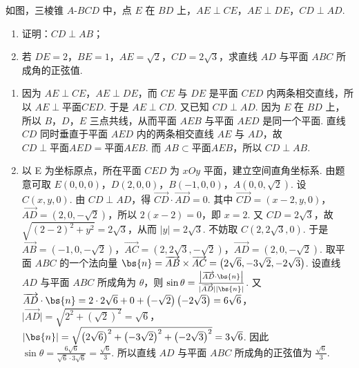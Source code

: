 \begin{problem}
如图，三棱锥 \(A\)-\(BCD\) 中，点 \(E\) 在 \(BD\) 上，\(AE\perp CE\)，\(AE\perp DE\)，\(CD\perp AD\).

\begin{enumerate}
\item 证明：\(CD\perp AB\)；
\item 若 \(DE=2\)，\(BE=1\)，\(AE=\sqrt{2}\)，\(CD=2\sqrt{3}\)，求直线 \(AD\) 与平面 \(ABC\) 所成角的正弦值.
\end{enumerate}

\end{problem}

\begin{solution}
\begin{enumerate}
\item 因为 \(AE\perp CE\)，\(AE\perp DE\)，而 \(CE\) 与 \(DE\) 是平面 \(CED\) 内两条相交直线，所以 \(AE\perp \text{平面} CED\). 于是 \(AE\perp CD\).
又已知 \(CD\perp AD\). 因为 \(E\) 在 \(BD\) 上，所以 \(B\)，\(D\)，\(E\) 三点共线，从而平面 \(AEB\) 与平面 \(AED\) 是同一个平面. 直线 \(CD\) 同时垂直于平面 \(AED\) 内的两条相交直线 \(AE\) 与 \(AD\)，故 \(CD\perp \text{平面} AED=\text{平面} AEB\). 而 \(AB\subset \text{平面} AEB\)，所以 \(CD\perp AB\).

\item 以 E 为坐标原点，所在平面 \(CED\) 为 \(xOy\) 平面，建立空间直角坐标系. 由题意可取 \(E(0,0,0)\)，\(D(2,0,0)\)，\(B(-1,0,0)\)，\(A(0,0,\sqrt{2})\). 设 \(C(x,y,0)\).
由 \(CD\perp AD\)，得 \(\overrightarrow{CD}\cdot \overrightarrow{AD}=0\). 其中 \(\overrightarrow{CD}=(x-2,y,0)\)，\(\overrightarrow{AD}=(2,0,-\sqrt{2})\)，所以 \(2\left( x-2 \right)=0\)，即 \(x=2\). 又 \(CD=2\sqrt{3}\)，故 \(\sqrt{\left( 2-2 \right)^2+y^2}=2\sqrt{3}\)，从而 \(\lvert y \rvert=2\sqrt{3}\). 不妨取 \(C(2,2\sqrt{3},0)\).
于是 \(\overrightarrow{AB}=(-1,0,-\sqrt{2})\)，\(\overrightarrow{AC}=(2,2\sqrt{3},-\sqrt{2})\)，\(\overrightarrow{AD}=(2,0,-\sqrt{2})\). 取平面 \(ABC\) 的一个法向量 \(\bs{n}=\overrightarrow{AB}\times \overrightarrow{AC}=\left( 2\sqrt{6},-3\sqrt{2},-2\sqrt{3} \right)\). 设直线 \(AD\) 与平面 \(ABC\) 所成角为 \(\theta\)，则 \(\sin \theta=\frac{\left| \overrightarrow{AD}\cdot \bs{n} \right|}{\lvert \overrightarrow{AD} \rvert \lvert \bs{n} \rvert}\). 又 \(\overrightarrow{AD}\cdot \bs{n}=2\cdot 2\sqrt{6}+0+\left( -\sqrt{2} \right)\left( -2\sqrt{3} \right)=6\sqrt{6}\)，\(\lvert \overrightarrow{AD} \rvert=\sqrt{2^2+\left( \sqrt{2} \right)^2}=\sqrt{6}\)，\(\lvert \bs{n} \rvert=\sqrt{\left( 2\sqrt{6} \right)^2+\left( -3\sqrt{2} \right)^2+\left( -2\sqrt{3} \right)^2}=3\sqrt{6}\). 因此 \(\sin \theta=\frac{6\sqrt{6}}{\sqrt{6}\cdot 3\sqrt{6}}=\frac{\sqrt{6}}{3}\). 所以直线 \(AD\) 与平面 \(ABC\) 所成角的正弦值为 \(\frac{\sqrt{6}}{3}\).
\end{enumerate}
\end{solution}

